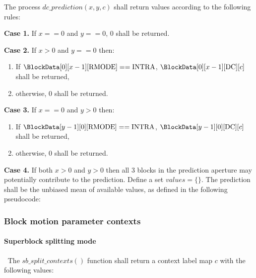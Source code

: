 The process $dc\_prediction(x, y, c)$ shall return values according to
the following rules:

{\bf Case 1.}  If $x==0$ and $y==0$, $0$ shall be returned.

{\bf Case 2.} If $x>0$ and $y==0$ then:
\begin{enumerate}
   \item If $\BlockData[0][x-1][\RMode]==\Intra$, $\BlockData[0][x-1][\DC][c]$ 
shall be returned,
   \item otherwise, $0$ shall be returned.
\end{enumerate}

{\bf Case 3.} If $x==0$ and $y>0$ then:
\begin{enumerate}
   \item If $\BlockData[y-1][0][\RMode]==\Intra$, $\BlockData[y-1][0][\DC][c]$
shall be returned,
   \item otherwise, 0 shall be returned.
\end{enumerate}

{\bf Case 4.} If both $x>0$ and $y>0$ then all 3 blocks in the prediction aperture may
 potentially contribute to the prediction. Define a set $values=\{\}$. The prediction shall
be the unbiased mean of available values, as defined in the following pseudocode:

\begin{pseudo*}
    \bsIF{\BlockData[y][x-1][\RMode]==\Intra}
    \bsEND
    \bsIF{\BlockData[y-1][x][\RMode]==\Intra}
    \bsEND
    \bsIF{\BlockData[y-1][x-1][\RMode]==\Intra}
    \bsEND
    \bsELSE
    \bsEND
\bsEND
\end{pseudo*}

\subsubsection{Block motion parameter contexts}

\paragraph{Superblock splitting mode}\label{sbcontexts}
$\ $\newline
The $sb\_split\_contexts()$ function shall return a context label map $c$ with the 
following values:

